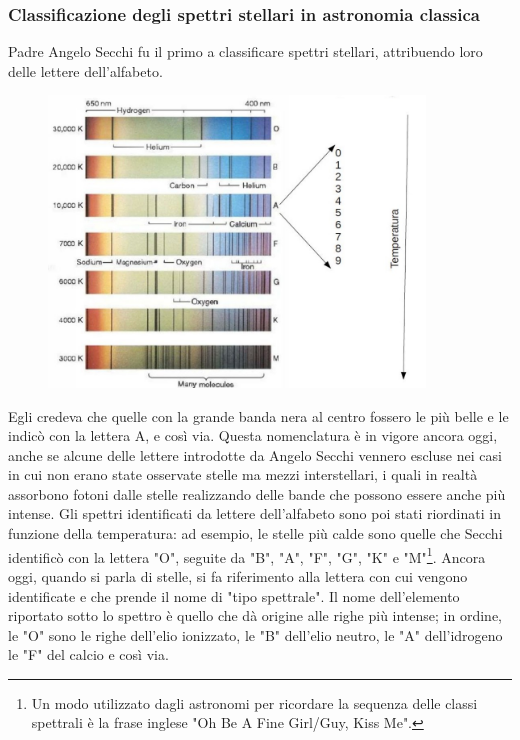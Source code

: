 \subsubsection{Classificazione degli spettri stellari in astronomia classica}

Padre Angelo Secchi fu il primo a classificare spettri stellari, attribuendo loro delle lettere dell'alfabeto.

\begin{figure}[H]
  \centering
  \includegraphics[width=10cm]{angelo_secchi.jpg}
\end{figure}

Egli credeva che quelle con la grande banda nera al centro fossero le più belle e le indicò con la lettera A, e così via. Questa nomenclatura è in vigore ancora oggi, anche se alcune delle lettere introdotte da Angelo Secchi vennero escluse nei casi in cui non erano state osservate stelle ma mezzi interstellari, i quali in realtà assorbono fotoni dalle stelle realizzando delle bande che possono essere anche più intense. Gli spettri identificati da lettere dell'alfabeto sono poi stati riordinati in funzione della temperatura: ad esempio, le stelle più calde sono quelle che Secchi identificò con la lettera "O", seguite da "B", "A", "F", "G", "K" e "M"\footnote{Un modo utilizzato dagli astronomi per ricordare la sequenza delle classi spettrali è la frase inglese "Oh Be A Fine Girl/Guy, Kiss Me".}. Ancora oggi, quando si parla di stelle, si fa riferimento alla lettera con cui vengono identificate e che prende il nome di "tipo spettrale". Il nome dell'elemento riportato sotto lo spettro è quello che dà origine alle righe più intense; in ordine, le "O" sono le righe dell'elio ionizzato, le "B" dell'elio neutro, le "A" dell'idrogeno  le "F" del calcio e così via.

